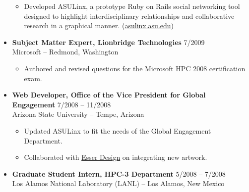 \documentclass[10pt,letterpaper]{article}
\begin{document}
\begin{itemize}
\begin{itemize}
  \item Developed ASULinx, a prototype Ruby on Rails social networking tool
  designed to highlight interdisciplinary relationships and collaborative
  research in a graphical manner.
	(\href{http://asulinx.asu.edu}{asulinx.asu.edu})


\end{itemize}

%

\item \textbf{Subject Matter Expert, Lionbridge Technologies}
\hfill{7/2009} \\
Microsoft -- Redmond, Washington

\begin{itemize}

	\item Authored and revised questions for the Microsoft HPC 2008
	certification exam.

\end{itemize}

\item \textbf{Web Developer, Office of the Vice President for Global Engagement}
\hfill{7/2008 -- 11/2008} \\
Arizona State University -- Tempe, Arizona

\begin{itemize}

	\item Updated ASULinx to fit the needs of the Global Engagement Department.

	\item Collaborated with \href{http://www.esserdesign.com/}{Esser
	Design} on integrating new artwork.

\end{itemize}


\item \textbf{Graduate Student Intern, HPC-3 Department}
\hfill{5/2008 -- 7/2008} \\
Los Alamos National Laboratory (LANL) -- Los Alamos, New Mexico


\end{itemize}
\end{document}
